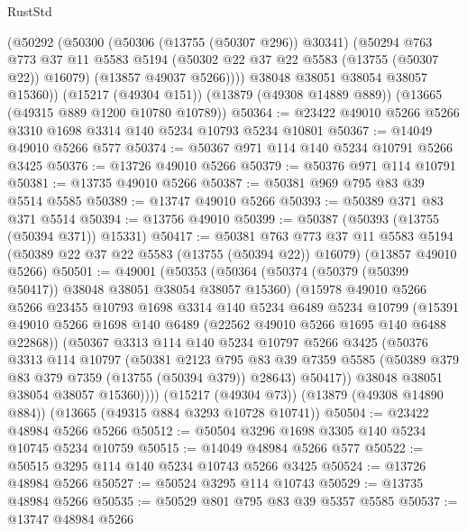 \begin{lexlean}{RustStd}
\begin{coremodule}
        (@50292
          (@50300
            (@50306 (@13755 (@50307 @296)) @30341)
            (@50294
              @763
              @773
              @37
              @11
              @5583
              @5194
              (@50302 @22 @37 @22 @5583 (@13755 (@50307 @22)) @16079)
              (@13857 @49037 @5266))))
        @38048
        @38051
        @38054
        @38057
        @15360))
    (@15217 (@49304 @151))
    (@13879 (@49308 @14889 @889))
    (@13665 (@49315 @889 @1200 @10780 @10789))
@50364 := @23422 @49010 @5266 @5266 @3310 @1698 @3314 @140 @5234 @10793 @5234 @10801
@50367 := @14049 @49010 @5266 @577
@50374 := @50367 @971 @114 @140 @5234 @10791 @5266 @3425
@50376 := @13726 @49010 @5266
@50379 := @50376 @971 @114 @10791
@50381 := @13735 @49010 @5266
@50387 := @50381 @969 @795 @83 @39 @5514 @5585
@50389 := @13747 @49010 @5266
@50393 := @50389 @371 @83 @371 @5514
@50394 := @13756 @49010
@50399 := @50387 (@50393 (@13755 (@50394 @371)) @15331)
@50417 := @50381
    @763
    @773
    @37
    @11
    @5583
    @5194
    (@50389 @22 @37 @22 @5583 (@13755 (@50394 @22)) @16079)
    (@13857 @49010 @5266)
@50501 := @49001
    (@50353
      (@50364
        (@50374 (@50379 (@50399 @50417)) @38048 @38051 @38054 @38057 @15360)
        (@15978
          @49010
          @5266
          @5266
          @23455
          @10793
          @1698
          @3314
          @140
          @5234
          @6489
          @5234
          @10799
          (@15391 @49010 @5266 @1698 @140 @6489 (@22562 @49010 @5266 @1695 @140 @6488 @22868))
          (@50367
            @3313
            @114
            @140
            @5234
            @10797
            @5266
            @3425
            (@50376
              @3313
              @114
              @10797
              (@50381
                @2123
                @795
                @83
                @39
                @7359
                @5585
                (@50389 @379 @83 @379 @7359 (@13755 (@50394 @379)) @28643)
                @50417))
            @38048
            @38051
            @38054
            @38057
            @15360))))
    (@15217 (@49304 @73))
    (@13879 (@49308 @14890 @884))
    (@13665 (@49315 @884 @3293 @10728 @10741))
@50504 := @23422 @48984 @5266 @5266
@50512 := @50504 @3296 @1698 @3305 @140 @5234 @10745 @5234 @10759
@50515 := @14049 @48984 @5266 @577
@50522 := @50515 @3295 @114 @140 @5234 @10743 @5266 @3425
@50524 := @13726 @48984 @5266
@50527 := @50524 @3295 @114 @10743
@50529 := @13735 @48984 @5266
@50535 := @50529 @801 @795 @83 @39 @5357 @5585
@50537 := @13747 @48984 @5266

\end{coremodule}
\end{lexlean}
